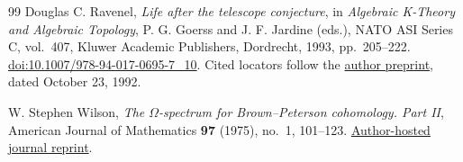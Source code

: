 \begin{thebibliography}{99}
Douglas C. Ravenel,
\emph{Life after the telescope conjecture},
in \emph{Algebraic K-Theory and Algebraic Topology},
P. G. Goerss and J. F. Jardine (eds.),
NATO ASI Series C, vol.~407, Kluwer Academic Publishers,
Dordrecht, 1993, pp.~205--222.
\href{https://doi.org/10.1007/978-94-017-0695-7_10}{doi:10.1007/978-94-017-0695-7\_10}.
Cited locators follow the
\href{https://www.sas.rochester.edu/mth/sites/doug-ravenel/mypapers/ll.pdf}{author preprint},
dated October 23, 1992.

W. Stephen Wilson,
\emph{The $\Omega$-spectrum for Brown--Peterson cohomology. Part II},
American Journal of Mathematics \textbf{97} (1975), no.~1, 101--123.
\href{https://math.jhu.edu/~wsw/papers2/math/06-spectrum-part2-1975.pdf}{Author-hosted journal reprint}.

\end{thebibliography}
